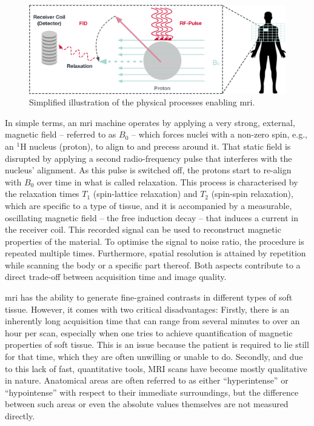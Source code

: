 \begin{figure}[b]
    \centering
    \includegraphics[width=\textwidth]{figures/mri.eps}
    \caption{Simplified illustration of the physical processes enabling \acrshort{mri}.}
    \label{figure:mri}
\end{figure}

In simple terms, an \acrshort{mri} machine operates by applying a very strong, external, magnetic field -- referred to as $B_0$ -- which forces nuclei with a non-zero spin, e.g., an $^{1}\text{H}$ nucleus (proton), to align to and precess around it. That static field is disrupted by applying a second radio-frequency pulse that interferes with the nucleus' alignment. As this pulse is switched off, the protons start to re-align with $B_0$ over time in what is called relaxation. This process is characterised by the relaxation times $T_1$ (spin-lattice relaxation) and $T_2$ (spin-spin relaxation), which are specific to a type of tissue, and it is accompanied by a measurable, oscillating magnetic field -- the free induction decay --  that induces a current in the receiver coil. This recorded signal can be used to reconstruct magnetic properties of the material. To optimise the signal to noise ratio, the procedure is repeated multiple times. Furthermore, spatial resolution is attained by repetition while scanning the body or a specific part thereof. Both aspects contribute to a direct trade-off between acquisition time and image quality.

\acrshort{mri} has the ability to generate fine-grained contrasts in different types of soft tissue. However, it comes with two critical disadvantages: Firstly, there is an inherently long acquisition time that can range from several minutes to over an hour per scan, especially when one tries to achieve quantification of magnetic properties of soft tissue. This is an issue because the patient is required to lie still for that time, which they are often unwilling or unable to do. Secondly, and due to this lack of fast, quantitative tools, MRI scans have become mostly qualitative in nature. Anatomical areas are often referred to as either ``hyperintense'' or ``hypointense'' with respect to their immediate surroundings, but the difference between such areas or even the absolute values themselves are not measured directly.

